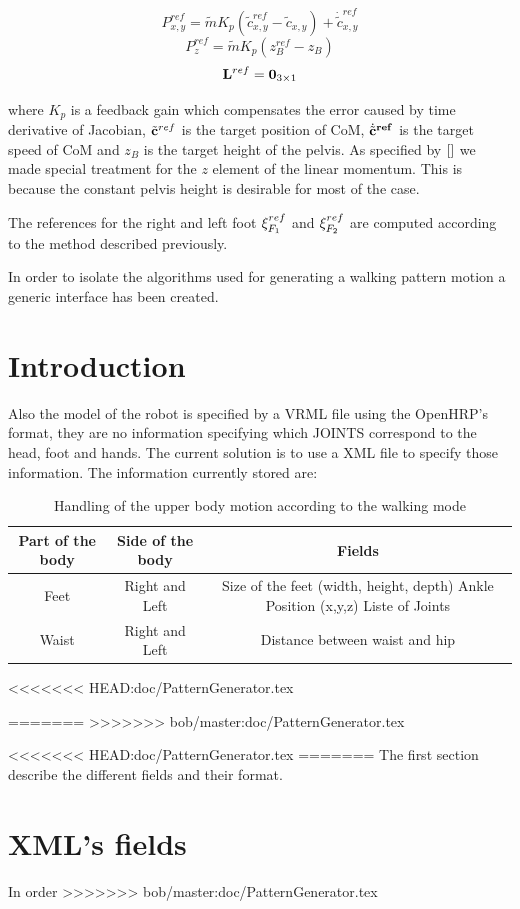 \begin{equation}
P^{ref}_{x,y} = \tilde{m}K_p (\tilde{c}_{x,y}^{ref} - \tilde{c}_{x,y} )+ \dot{\tilde{c}}^{ref}_{x,y}
\label{eq:XYLinearMomentum}
\end{equation}
\begin{equation}
P^{ref}_{z} = \tilde{m} K_p (z_B^{ref} - z_B)
\label{eq:ZLinearMomentum}
\end{equation}
\begin{equation}
{\bf L}^{ref} = {\bf 0}_{3 \times 1}
\end{equation}

where $K_p$ is a feedback gain which compensates the error caused by time derivative of Jacobian,
$\tilde{\bf c}^{ref}$ is the target position of CoM, $\dot{\tilde{\bf c}}^{ref}$ is the target
speed of CoM and $z_B$ is the target height of the pelvis. As specified by $\cite{}$
we made special treatment for the $z$ element of the linear momentum. This is because the constant
pelvis height is desirable for most of the case.
\par
The references for the right and left foot ${\bf \xi}^{ref}_{F_1}$ and ${\bf \xi}^{ref}_{F_2}$
are computed according to the method described previously.


In order to isolate the algorithms used for generating a walking pattern motion
a generic interface has been created.


\section{Introduction}
Also the model of the robot is specified by a VRML file using the OpenHRP's format,
they are no information specifying which JOINTS correspond to the head, foot and hands.
The current solution is to use a XML file to specify those information.
The information currently stored are:
\begin{table}
\begin{tabular}{|c|c|c|} \hline
Part of the body & Side of the body & Fields \\ \hline \hline
Feet & Right and Left &
Size of the feet (width, height, depth) \linebreak
Ankle Position (x,y,z) \linebreak
Liste of Joints  \\ \hline
Waist & Right and Left & Distance between waist and hip \\ \hline
\end{tabular}
<<<<<<< HEAD:doc/PatternGenerator.tex
\caption{Handling of the upper body motion according to the walking mode}
=======
>>>>>>> bob/master:doc/PatternGenerator.tex
\end{table}
<<<<<<< HEAD:doc/PatternGenerator.tex
=======
The first section describe the different fields and their format.

\section{XML's fields}
In order
>>>>>>> bob/master:doc/PatternGenerator.tex
